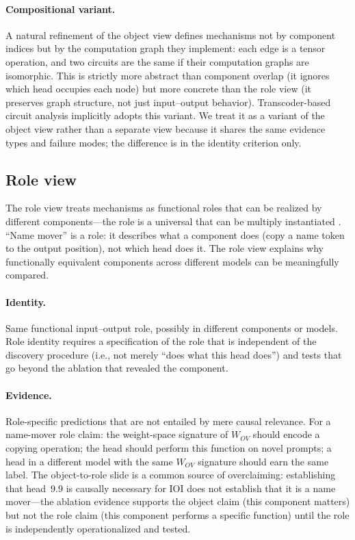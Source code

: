 \documentclass{article}
\begin{document}
\paragraph{Compositional variant.}
A natural refinement of the object view defines mechanisms not by
component indices but by the computation graph they implement: each edge
is a tensor operation, and two circuits are the same if their
computation graphs are isomorphic.  This is strictly more
abstract than component overlap (it ignores which head occupies each
node) but more concrete than the role view (it preserves graph
structure, not just input--output behavior).  Transcoder-based
circuit analysis implicitly adopts this variant.  We treat it as a
variant of the object view rather than a separate view because it
shares the same evidence types and failure modes; the difference is
in the identity criterion only.

\subsection{Role view}

The role view treats mechanisms as functional roles that can be realized
by different components---the role is a universal that can be multiply
instantiated \citep{lewis1972}.  ``Name mover'' is a role: it describes
what a component does (copy a name token to the output position), not
which head does it.  The role view explains why functionally equivalent
components across different models can be meaningfully compared.

\paragraph{Identity.}
Same functional input--output role, possibly in different components or
models.  Role identity requires a specification of the role that is
independent of the discovery procedure (i.e., not merely ``does what
this head does'') and tests that go beyond the ablation that revealed
the component.

\paragraph{Evidence.}
Role-specific predictions that are not entailed by mere causal relevance.
For a name-mover role claim: the weight-space signature of $W_{OV}$
should encode a copying operation; the head should perform this function
on novel prompts; a head in a different model with the same $W_{OV}$
signature should earn the same label.  The object-to-role slide is
a common source of overclaiming: establishing
that head~9.9 is causally necessary for IOI does not establish that it
is a name mover---the ablation evidence supports the object claim
(this component matters) but not the role claim (this component performs
a specific function) until the role is independently operationalized
and tested.
\end{document}
